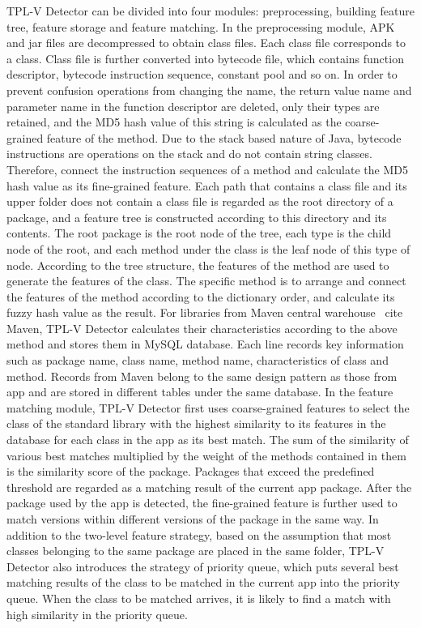 \begin{digest}
TPL-V Detector can be divided into four modules: preprocessing, building feature tree, feature storage and feature matching. In the preprocessing module, APK and jar files are decompressed to obtain class files. Each class file corresponds to a class. Class file is further converted into bytecode file, which contains function descriptor, bytecode instruction sequence, constant pool and so on. In order to prevent confusion operations from changing the name, the return value name and parameter name in the function descriptor are deleted, only their types are retained, and the MD5 hash value of this string is calculated as the coarse-grained feature of the method. Due to the stack based nature of Java, bytecode instructions are operations on the stack and do not contain string classes. Therefore, connect the instruction sequences of a method and calculate the MD5 hash value as its fine-grained feature. Each path that contains a class file and its upper folder does not contain a class file is regarded as the root directory of a package, and a feature tree is constructed according to this directory and its contents. The root package is the root node of the tree, each type is the child node of the root, and each method under the class is the leaf node of this type of node. According to the tree structure, the features of the method are used to generate the features of the class. The specific method is to arrange and connect the features of the method according to the dictionary order, and calculate its fuzzy hash value as the result. For libraries from Maven central warehouse \ cite {Maven}, TPL-V Detector calculates their characteristics according to the above method and stores them in MySQL database. Each line records key information such as package name, class name, method name, characteristics of class and method. Records from Maven belong to the same design pattern as those from app and are stored in different tables under the same database. In the feature matching module, TPL-V Detector first uses coarse-grained features to select the class of the standard library with the highest similarity to its features in the database for each class in the app as its best match. The sum of the similarity of various best matches multiplied by the weight of the methods contained in them is the similarity score of the package. Packages that exceed the predefined threshold are regarded as a matching result of the current app package. After the package used by the app is detected, the fine-grained feature is further used to match versions within different versions of the package in the same way. In addition to the two-level feature strategy, based on the assumption that most classes belonging to the same package are placed in the same folder, TPL-V Detector also introduces the strategy of priority queue, which puts several best matching results of the class to be matched in the current app into the priority queue. When the class to be matched arrives, it is likely to find a match with high similarity in the priority queue.




\end{digest}
